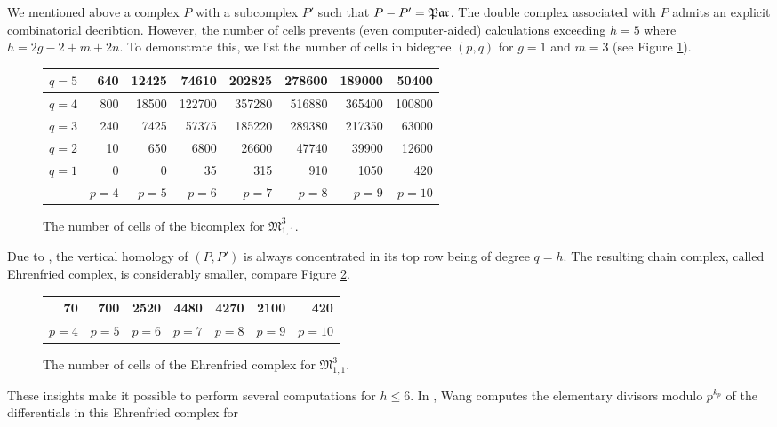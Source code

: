 We mentioned above a complex $P$ with a subcomplex $P'$ such that $P - P' = \mathfrak{Par}$.
The double complex associated with $P$ admits an explicit combinatorial decribtion.
However, the number of cells prevents (even computer-aided) calculations exceeding $h = 5$ where $h = 2g-2+m+2n$.
To demonstrate this, we list the number of cells in bidegree $(p,q)$ for $g=1$ and $m=3$ (see Figure \ref{introduction:number_cells_g_1_m_3_n_1}).
\begin{figure}[ht]
    \centering
    \begin{tabular}{|r||r|r|r|r|r|r|r|}
        \hline
        $q=5$ & 640 & 12425 & 74610 & 202825 & 278600 & 189000 & 50400 \\ \hline
        $q=4$ & 800 & 18500 & 122700 & 357280 & 516880 & 365400 & 100800 \\ \hline
        $q=3$ & 240 & 7425 & 57375 & 185220 & 289380 & 217350 & 63000 \\ \hline
        $q=2$ & 10 & 650 & 6800 & 26600 & 47740 & 39900 & 12600 \\ \hline
        $q=1$ & 0 & 0 & 35 & 315 & 910 & 1050 & 420 \\ \hline \hline
              & $p=4$ & $p=5$ & $p=6$ & $p=7$ & $p=8$ & $p=9$ & $p=10$ \\ \hline
    \end{tabular}
    \caption{\label{introduction:number_cells_g_1_m_3_n_1}The number of cells of the bicomplex for $\mathfrak M_{1,1}^3$.}
\end{figure}
Due to \cite{Visy201011}, the vertical homology of $(P,P')$ is always concentrated in its top row being of degree $q=h$.
The resulting chain complex, called Ehrenfried complex, is considerably smaller, compare Figure \ref{introduction:cells_ehr_g_1_m_3_n_1}.
\begin{figure}[ht]
    \centering
    \begin{tabular}{|r|r|r|r|r|r|r|}
        \hline
        70 & 700 & 2520 & 4480 & 4270 & 2100 & 420 \\ \hline \hline
        $p=4$ & $p=5$ & $p=6$ & $p=7$ & $p=8$ & $p=9$ & $p=10$ \\ \hline
    \end{tabular}
    \caption{\label{introduction:cells_ehr_g_1_m_3_n_1}The number of cells of the Ehrenfried complex for $\mathfrak M_{1,1}^3$.}
\end{figure}
These insights make it possible to perform several computations for $h \le 6$.
In \cite{Wang201102}, Wang computes the elementary divisors modulo $p^{k_p}$ of the differentials in this Ehrenfried complex for
